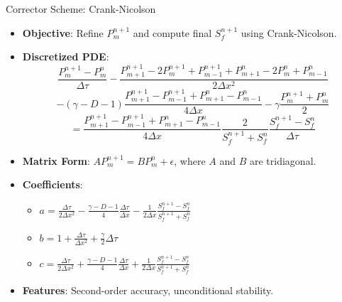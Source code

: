 \documentclass{beamer}
\begin{document}
\begin{frame}{Corrector Scheme: Crank-Nicolson}
    \begin{itemize}
        \item \textbf{Objective}: Refine \( P_m^{n+1} \) and compute final \( S_f^{n+1} \) using Crank-Nicolson.
        \item \textbf{Discretized PDE}:
        \[
        \frac{P_m^{n+1} - P_m^n}{\Delta \tau} - \frac{P_{m+1}^{n+1} - 2 P_m^{n+1} + P_{m-1}^{n+1} + P_{m+1}^n - 2 P_m^n + P_{m-1}^n}{2 \Delta x^2}
        \]
        \[
        - (\gamma - D - 1) \frac{P_{m+1}^{n+1} - P_{m-1}^{n+1} + P_{m+1}^n - P_{m-1}^n}{4 \Delta x} - \gamma \frac{P_m^{n+1} + P_m^n}{2}
        \]
        \[
        = \frac{P_{m+1}^{n+1} - P_{m-1}^{n+1} + P_{m+1}^n - P_{m-1}^n}{4 \Delta x} \frac{2}{S_f^{n+1} + S_f^n} \frac{S_f^{n+1} - S_f^n}{\Delta \tau}
        \]
        \item \textbf{Matrix Form}: \( A P_m^{n+1} = B P_m^n + \epsilon \), where \( A \) and \( B \) are tridiagonal.
        \item \textbf{Coefficients}:
        \begin{itemize}
            \item \( a = \frac{\Delta \tau}{2 \Delta x^2} - \frac{\gamma - D - 1}{4} \frac{\Delta \tau}{\Delta x} - \frac{1}{2 \Delta x} \frac{S_f^{n+1} - S_f^n}{S_f^{n+1} + S_f^n} \)
            \item \( b = 1 + \frac{\Delta \tau}{\Delta x^2} + \frac{\gamma}{2} \Delta \tau \)
            \item \( c = \frac{\Delta \tau}{2 \Delta x^2} + \frac{\gamma - D - 1}{4} \frac{\Delta \tau}{\Delta x} + \frac{1}{2 \Delta x} \frac{S_f^{n+1} - S_f^n}{S_f^{n+1} + S_f^n} \)
        \end{itemize}
        \item \textbf{Features}: Second-order accuracy, unconditional stability.
    \end{itemize}
\end{frame}
\end{document}
